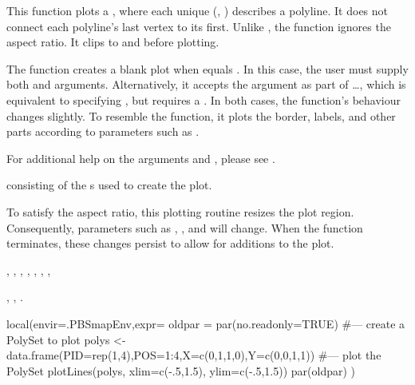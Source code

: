 \documentclass[letterpaper]{book}
\begin{document}
%
\begin{Details}\relax
This function plots a , where each unique (,
) describes a polyline.  It does not connect each polyline's
last vertex to its first.  Unlike , the function
ignores the aspect ratio.  It clips  to  and
 before plotting.

The function creates a blank plot when  equals
.  In this case, the user must supply both  and
 arguments.  Alternatively, it accepts the argument
 as part of \dots, which is equivalent to specifying
, but requires a .  In both cases,
the function's behaviour changes slightly.  To resemble the
 function, it plots the border, labels, and other
parts according to  parameters such as .

For additional help on the arguments  and , please
see .
\end{Details}
%
\begin{Value}
 consisting of the s used to create the plot.
\end{Value}
%
\begin{Note}\relax
To satisfy the aspect ratio, this plotting routine resizes the plot
region.  Consequently,  parameters such as
, , and  will change.  When the function
terminates, these changes persist to allow for additions to the plot.
\end{Note}
%
\begin{SeeAlso}\relax
{}, , ,
, , ,
,

, , .
\end{SeeAlso}
%
\begin{Examples}
\begin{ExampleCode}
local(envir=.PBSmapEnv,expr={
  oldpar = par(no.readonly=TRUE)
  #--- create a PolySet to plot
  polys <- data.frame(PID=rep(1,4),POS=1:4,X=c(0,1,1,0),Y=c(0,0,1,1))
  #--- plot the PolySet
  plotLines(polys, xlim=c(-.5,1.5), ylim=c(-.5,1.5))
  par(oldpar)
})
\end{ExampleCode}
\end{Examples}
\end{document}
